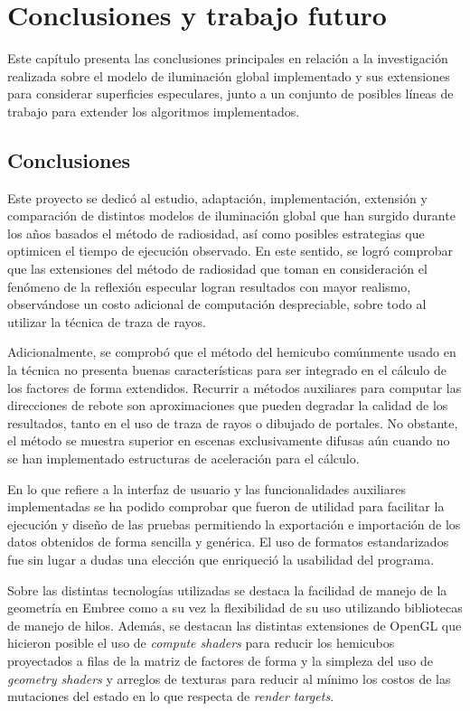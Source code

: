\chapter{Conclusiones y trabajo futuro}
\label{ch:chap06}

Este capítulo presenta las conclusiones principales en relación a la investigación realizada sobre el modelo de iluminación global implementado y sus extensiones para considerar superficies especulares, junto a un conjunto de posibles líneas de trabajo para extender los algoritmos implementados.

\section{Conclusiones}
\label{sec:conclusiones}

Este proyecto se dedicó al estudio, adaptación, implementación, extensión y comparación de distintos modelos de iluminación global que han surgido durante los años basados el método de radiosidad, así como posibles estrategias que optimicen el tiempo de ejecución observado. En este sentido, se logró comprobar que las extensiones del método de radiosidad que toman en consideración el fenómeno de la reflexión especular logran resultados con mayor realismo, observándose un costo adicional de computación despreciable, sobre todo al utilizar la técnica de traza de rayos.

Adicionalmente, se comprobó que el método del hemicubo comúnmente usado en la técnica no presenta buenas características para ser integrado en el cálculo de los factores de forma extendidos. Recurrir a métodos auxiliares para computar las direcciones de rebote son aproximaciones que pueden degradar la calidad de los resultados, tanto en el uso de traza de rayos o dibujado de portales. No obstante, el método se muestra superior en escenas exclusivamente difusas aún cuando no se han implementado estructuras de aceleración para el cálculo.

En lo que refiere a la interfaz de usuario y las funcionalidades auxiliares implementadas se ha podido comprobar que fueron de utilidad para facilitar la ejecución y diseño de las pruebas permitiendo la exportación e importación de los datos obtenidos de forma sencilla y genérica. El uso de formatos estandarizados fue sin lugar a dudas una elección que enriqueció la usabilidad del programa.

Sobre las distintas tecnologías utilizadas se destaca la facilidad de manejo de la geometría en Embree como a su vez la flexibilidad de su uso utilizando bibliotecas de manejo de hilos. Además, se destacan las distintas extensiones de OpenGL que hicieron posible el uso de \textit{compute shaders} para reducir los hemicubos proyectados a filas de la matriz de factores de forma y la simpleza del uso de \textit{geometry shaders} y arreglos de texturas para reducir al mínimo los costos de las mutaciones del estado en lo que respecta de \textit{render targets}.

